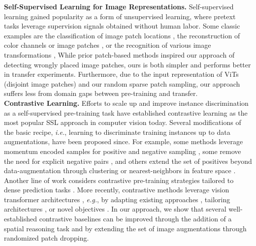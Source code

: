 \documentclass[letterpaper]{article} \usepackage{aaai23}  \usepackage{times}  \usepackage{helvet}  \usepackage{courier}  \usepackage[hyphens]{url}  \usepackage{graphicx} \urlstyle{rm} \def\UrlFont{\rm}  \usepackage{natbib}  \usepackage{caption} \frenchspacing  \setlength{\pdfpagewidth}{8.5in}  \setlength{\pdfpageheight}{11in}  \usepackage{algorithm}
\begin{document}
\noindent\textbf{Self-Supervised Learning for Image Representations.} Self-supervised learning gained popularity as a form of unsupervised learning, where pretext tasks leverage supervision signals obtained without human labor. 
Some classic examples are the classification of image patch locations \cite{doersch2015unsupervised,noroozi2016unsupervised}, the reconstruction of color channels \cite{zhang2016colorful} or image patches \cite{pathakCVPR16context}, or the recognition of various image transformations  \cite{gidaris2018unsupervised,jenni2018self},
While prior patch-based methods inspired our approach of detecting wrongly placed image patches, ours is both simpler and performs better in transfer experiments. Furthermore, due to the input representation of ViTs (disjoint image patches) and our random sparse patch sampling, our approach suffers less from domain gaps between pre-training and transfer.\\ 
\noindent\textbf{Contrastive Learning.}
Efforts to scale up and improve instance discrimination \cite{dosovitskiy2015discriminative,wu2018unsupervised} as a self-supervised pre-training task have established contrastive learning \cite{chen2020simple,he2020momentum,oord2018representation} as the most popular SSL approach in computer vision today.
Several modifications of the basic recipe, \emph{i.e.}, learning to discriminate training instances up to data augmentations, have been proposed since. 
For example, some methods leverage momentum encoded samples for positive and negative sampling \cite{he2020momentum,chen2020improved}, some remove the need for explicit negative pairs \cite{Grill2020BootstrapYO,chen2020exploring}, and others extend the set of positives beyond data-augmentation through clustering \cite{caron2020unsupervised} or nearest-neighbors in feature space \cite{dwibedi2021little}. 
Another line of work considers contrastive pre-training strategies tailored to dense prediction tasks \cite{o2020unsupervised,wang2021dense,xiao2021region,xie2021propagate,li2021dense,liu2021efficient}. 
More recently, contrastive methods leverage vision transformer architectures \cite{dosovitskiy2020image,liu2021swin}, \emph{e.g.}, by adapting existing approaches \cite{chen2021empirical,xie2021self}, tailoring architectures \cite{li2021efficient}, or novel objectives \cite{caron2021emerging}. 
In our approach, we show that several well-established contrastive baselines \cite{chen2021empirical, caron2021emerging, chen2020simple} can be improved through the addition of a spatial reasoning task and by extending the set of image augmentations through randomized patch dropping. \\
\end{document}
